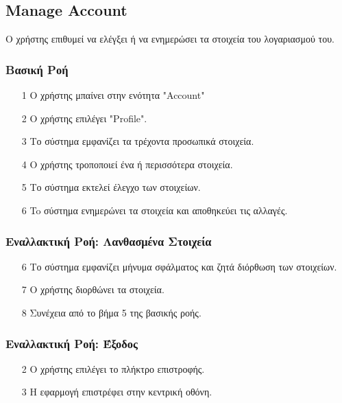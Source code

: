 \subsection{Manage Account}
\label{uc:manage-account}

Ο χρήστης επιθυμεί να ελέγξει ή να ενημερώσει τα στοιχεία του λογαριασμού του.

\subsubsection{Βασική Ροή}

\begin{enumerate}
    \item[1] Ο χρήστης μπαίνει στην ενότητα "Account"
    \item[2] O χρήστης επιλέγει "Profile".
    \item[3] Το σύστημα εμφανίζει τα τρέχοντα προσωπικά στοιχεία.
    \item[4] Ο χρήστης τροποποιεί ένα ή περισσότερα στοιχεία.
    \item[5] Το σύστημα εκτελεί έλεγχο των στοιχείων.
    \item[6] To σύστημα ενημερώνει τα στοιχεία και αποθηκεύει τις αλλαγές.
\end{enumerate}

\subsubsection{Εναλλακτική Ροή: Λανθασμένα Στοιχεία}

\begin{enumerate}
    \item[6] Το σύστημα εμφανίζει μήνυμα σφάλματος και ζητά διόρθωση των στοιχείων.
    \item[7] Ο χρήστης διορθώνει τα στοιχεία.
    \item[8] Συνέχεια από το βήμα 5 της βασικής ροής.
\end{enumerate}

\subsubsection{Εναλλακτική Ροή: Έξοδος}

\begin{enumerate}
    \item[2] Ο χρήστης επιλέγει το πλήκτρο επιστροφής.
    \item[3] Η εφαρμογή επιστρέφει στην κεντρική οθόνη.
\end{enumerate}

